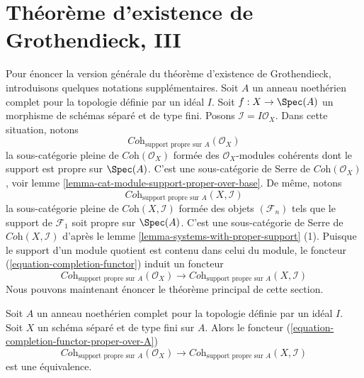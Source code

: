 \section{Théorème d'existence de Grothendieck, III}
\label{section-existence-proper-support}

\noindent
Pour énoncer la version générale du théorème d'existence
de Grothendieck, introduisons quelques notations supplémentaires. Soit $A$ un anneau noethérien complet
pour la topologie définie par un idéal $I$. Soit $f : X \to \Spec(A)$
un morphisme de schémas séparé et de type fini. Posons
$\mathcal{I} = I\mathcal{O}_X$. Dans cette situation, notons
$$
\textit{Coh}_{\text{support propre sur } A}(\mathcal{O}_X)
$$
la sous-catégorie pleine de $\textit{Coh}(\mathcal{O}_X)$
formée des $\mathcal{O}_X$-modules cohérents dont
le support est propre sur $\Spec(A)$. C'est une sous-catégorie de Serre de
$\textit{Coh}(\mathcal{O}_X)$, voir
lemme \ref{lemma-cat-module-support-proper-over-base}.
De même, notons
$$
\textit{Coh}_{\text{support propre sur } A}(X, \mathcal{I})
$$
la sous-catégorie pleine de $\textit{Coh}(X, \mathcal{I})$
formée des objets $(\mathcal{F}_n)$ tels que
le support de $\mathcal{F}_1$ soit propre sur $\Spec(A)$.
C'est une sous-catégorie de Serre de $\textit{Coh}(X, \mathcal{I})$
d'après le lemme \ref{lemma-systems-with-proper-support} (1). Puisque
le support d'un module quotient est contenu dans celui
du module, le foncteur (\ref{equation-completion-functor})
induit un foncteur
\begin{equation}
\label{equation-completion-functor-proper-over-A}
\textit{Coh}_{\text{support propre sur }A}(\mathcal{O}_X)
\longrightarrow
\textit{Coh}_{\text{support propre sur }A}(X, \mathcal{I})
\end{equation}
Nous pouvons maintenant énoncer le théorème principal de cette section.

\begin{theorem}
\label{theorem-grothendieck-existence}
\begin{reference}
\cite[III théorème 5.1.5]{EGA}
\end{reference}
Soit $A$ un anneau noethérien complet pour la topologie définie par un idéal $I$.
Soit $X$ un schéma séparé et de type fini sur $A$. Alors
le foncteur
(\ref{equation-completion-functor-proper-over-A})
$$
\textit{Coh}_{\text{support propre sur }A}(\mathcal{O}_X)
\longrightarrow
\textit{Coh}_{\text{support propre sur }A}(X, \mathcal{I})
$$
est une équivalence.
\end{theorem}

